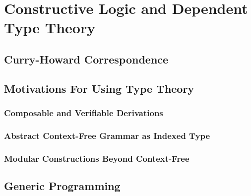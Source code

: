 \chapter{Constructive Logic and Dependent Type Theory}
    \section{Curry-Howard Correspondence}
    \section{Motivations For Using Type Theory}
        \subsection{Composable and Verifiable Derivations}
        \subsection{Abstract Context-Free Grammar as Indexed Type}
        \subsection{Modular Constructions Beyond Context-Free}
    \section{Generic Programming}